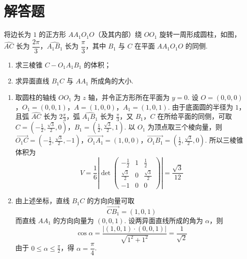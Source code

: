 \section{解答题}

\begin{problem}

将边长为 \(1\) 的正方形 \(AA_1O_1O\)（及其内部）绕 \(OO_1\) 旋转一周形成圆柱，如图，\(\widehat{AC}\) 长为 \(\dfrac{2\pi}{3}\)，\(\widehat{A_1B_1}\) 长为 \(\dfrac{\pi}{3}\)，其中 \(B_1\) 与 \(C\) 在平面 \(AA_1O_1O\) 的同侧.

\begin{enumerate}
\item 求三棱锥 \(C-O_1A_1B_1\) 的体积；
\item 求异面直线 \(B_1C\) 与 \(AA_1\) 所成角的大小.
\end{enumerate}

\end{problem}

\begin{solution}
\begin{enumerate}
\item 取圆柱的轴线 \(OO_1\) 为 \(z\) 轴，并令正方形所在平面为 \(y=0\). 设
\(O=(0,0,0)\)，\(O_1=(0,0,1)\)，\(A=(1,0,0)\)，\(A_1=(1,0,1)\).
由于底面圆的半径为 \(1\)，且弧 \(\widehat{AC}\) 长为 \(2\frac{\pi}{3}\)，弧 \(\widehat{A_1B_1}\) 长为 \(\frac{\pi}{3}\)，又 \(B_1\)，\(C\) 在所给平面的同侧，可取
\(C=\left(-\frac12,\frac{\sqrt3}{2},0\right)\)，\(B_1=\left(\frac12,\frac{\sqrt3}{2},1\right)\).
以 \(O_1\) 为顶点取三个棱向量，则
\(\overrightarrow{O_1C}=\left(-\frac12,\frac{\sqrt3}{2},-1\right)\)，\(\overrightarrow{O_1A_1}=(1,0,0)\)，\(\overrightarrow{O_1B_1}=\left(\frac12,\frac{\sqrt3}{2},0\right)\).
所以三棱锥体积为
\[
V=\frac16\left|\det\begin{pmatrix}
-\frac12&1&\frac12\\
\frac{\sqrt3}{2}&0&\frac{\sqrt3}{2}\\
-1&0&0
\end{pmatrix}\right|=\frac{\sqrt3}{12}
\]
\item 由上述坐标，直线 \(B_1C\) 的方向向量可取
\[
\overrightarrow{CB_1}=(1,0,1)
\]
而直线 \(AA_1\) 的方向向量为 \((0,0,1)\). 设两异面直线所成的角为 \(\alpha\)，则
\[
\cos\alpha=\frac{|(1,0,1)\cdot(0,0,1)|}{\sqrt{1^2+1^2}}=\frac1{\sqrt2}
\]
由于 \(0\leq\alpha\leq\frac{\pi}{2}\)，得 \(\alpha=\dfrac\pi4\).
\end{enumerate}
\end{solution}

